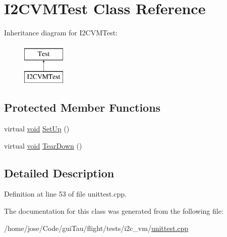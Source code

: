\hypertarget{class_i2_c_v_m_test}{\section{I2\-C\-V\-M\-Test Class Reference}
\label{class_i2_c_v_m_test}
}
Inheritance diagram for I2\-C\-V\-M\-Test\-:\begin{figure}[H]
\begin{center}
\leavevmode
\includegraphics[height=2.000000cm]{class_i2_c_v_m_test}
\end{center}
\end{figure}
\subsection*{Protected Member Functions}
\begin{DoxyCompactItemize}
\item 
virtual \hyperlink{group___n_a_m_e_ga18028b8badbf1ea7e704ccac3c488e82}{void} \hyperlink{group___unit_tests_ga14dcb45d7859a9c686f96f3ca84013c4}{Set\-Up} ()
\item 
virtual \hyperlink{group___n_a_m_e_ga18028b8badbf1ea7e704ccac3c488e82}{void} \hyperlink{group___unit_tests_ga7c761569820d4a0ce44dc316e20870e7}{Tear\-Down} ()
\end{DoxyCompactItemize}


\subsection{Detailed Description}


Definition at line 53 of file unittest.\-cpp.



The documentation for this class was generated from the following file\-:\begin{DoxyCompactItemize}
\item 
/home/jose/\-Code/gui\-Tau/flight/tests/i2c\-\_\-vm/\hyperlink{i2c__vm_2unittest_8cpp}{unittest.\-cpp}\end{DoxyCompactItemize}
